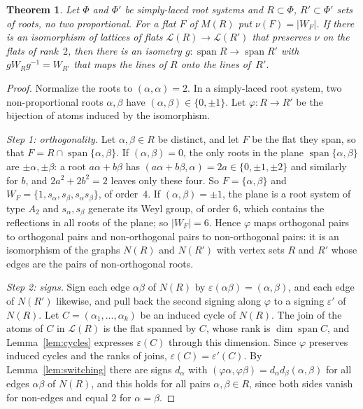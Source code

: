 \documentclass[11pt,a4paper]{article}
\numberwithin{equation}{section}
\theoremstyle{plain}
\newtheorem{theorem}{Theorem}[section]
\theoremstyle{definition}
\theoremstyle{remark}
\newcommand{\cL}{\mathcal{L}}
\DeclareMathOperator{\spn}{span}
\begin{document}
\begin{theorem}\label{thm:simply-laced}
Let $\Phi$ and $\Phi'$ be simply-laced root systems and $R\subset\Phi$, $R'\subset\Phi'$ sets of roots, no two proportional. For a flat $F$ of $M(R)$ put $\nu(F)=|W_F|$. If there is an isomorphism of lattices of flats $\cL(R)\to\cL(R')$ that preserves $\nu$ on the flats of rank~$2$, then there is an isometry $g\colon\spn R\to\spn R'$ with $gW_Rg^{-1}=W_{R'}$ that maps the lines of $R$ onto the lines of~$R'$.
\end{theorem}

\begin{proof}
Normalize the roots to $(\alpha,\alpha)=2$. In a simply-laced root system, two non-proportional roots $\alpha,\beta$ have $(\alpha,\beta)\in\{0,\pm1\}$. Let $\varphi\colon R\to R'$ be the bijection of atoms induced by the isomorphism.

\emph{Step 1: orthogonality.} Let $\alpha,\beta\in R$ be distinct, and let $F$ be the flat they span, so that $F=R\cap\spn\{\alpha,\beta\}$. If $(\alpha,\beta)=0$, the only roots in the plane $\spn\{\alpha,\beta\}$ are $\pm\alpha,\pm\beta$: a root $a\alpha+b\beta$ has $(a\alpha+b\beta,\alpha)=2a\in\{0,\pm1,\pm2\}$ and similarly for $b$, and $2a^2+2b^2=2$ leaves only these four. So $F=\{\alpha,\beta\}$ and $W_F=\{1,s_\alpha,s_\beta,s_\alpha s_\beta\}$, of order~$4$. If $(\alpha,\beta)=\pm1$, the plane is a root system of type $A_2$ and $s_\alpha,s_\beta$ generate its Weyl group, of order $6$, which contains the reflections in all roots of the plane; so $|W_F|=6$. Hence $\varphi$ maps orthogonal pairs to orthogonal pairs and non-orthogonal pairs to non-orthogonal pairs: it is an isomorphism of the graphs $N(R)$ and $N(R')$ with vertex sets $R$ and $R'$ whose edges are the pairs of non-orthogonal roots.

\emph{Step 2: signs.} Sign each edge $\alpha\beta$ of $N(R)$ by $\varepsilon(\alpha\beta)=(\alpha,\beta)$, and each edge of $N(R')$ likewise, and pull back the second signing along $\varphi$ to a signing $\varepsilon'$ of $N(R)$. Let $C=(\alpha_1,\dots,\alpha_k)$ be an induced cycle of $N(R)$. The join of the atoms of $C$ in $\cL(R)$ is the flat spanned by $C$, whose rank is $\dim\spn C$, and Lemma~\ref{lem:cycles} expresses $\varepsilon(C)$ through this dimension. Since $\varphi$ preserves induced cycles and the ranks of joins, $\varepsilon(C)=\varepsilon'(C)$. By Lemma~\ref{lem:switching} there are signs $d_\alpha$ with $(\varphi\alpha,\varphi\beta)=d_\alpha d_\beta(\alpha,\beta)$ for all edges $\alpha\beta$ of $N(R)$, and this holds for all pairs $\alpha,\beta\in R$, since both sides vanish for non-edges and equal $2$ for $\alpha=\beta$.


\end{proof}
\end{document}
